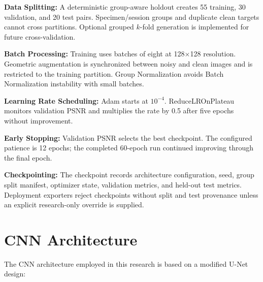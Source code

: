 \documentclass[12pt,a4paper]{report}
\begin{document}
\textbf{Data Splitting:} A deterministic group-aware holdout creates 55 training, 30 validation, and 20 test pairs. Specimen/session groups and duplicate clean targets cannot cross partitions. Optional grouped $k$-fold generation is implemented for future cross-validation.

\vspace{0.5cm}

\textbf{Batch Processing:} Training uses batches of eight at 128$\times$128 resolution. Geometric augmentation is synchronized between noisy and clean images and is restricted to the training partition. Group Normalization avoids Batch Normalization instability with small batches.

\vspace{0.5cm}

\textbf{Learning Rate Scheduling:} Adam starts at $10^{-4}$. ReduceLROnPlateau monitors validation PSNR and multiplies the rate by 0.5 after five epochs without improvement.

\vspace{0.5cm}

\textbf{Early Stopping:} Validation PSNR selects the best checkpoint. The configured patience is 12 epochs; the completed 60-epoch run continued improving through the final epoch.

\vspace{0.5cm}

\textbf{Checkpointing:} The checkpoint records architecture configuration, seed, group split manifest, optimizer state, validation metrics, and held-out test metrics. Deployment exporters reject checkpoints without split and test provenance unless an explicit research-only override is supplied.

\section{CNN Architecture}

The CNN architecture employed in this research is based on a modified U-Net design:

\vspace{0.5cm}
\end{document}
